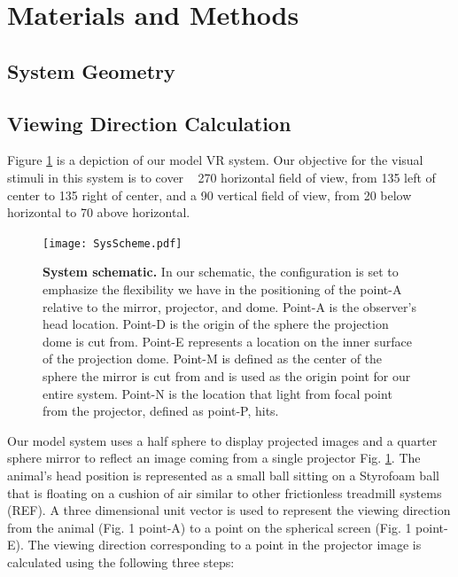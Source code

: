 \documentclass[10pt,letterpaper]{article}
\begin{document}
\section*{Materials and Methods}


\subsection*{System Geometry}

\subsection*{Viewing Direction Calculation}

Figure \ref{fig:SysScheme} is a depiction of our model VR system. Our objective
for the visual stimuli in this system is to cover ~ 270\textdegree{} horizontal
field of view, from 135\textdegree{} left of center to 135\textdegree{} right
of center, and a 90\textdegree{} vertical field of view, from 20\textdegree{}
below horizontal to 70\textdegree{} above horizontal. 

\begin{figure}[h]
\centering
\texttt{[image: SysScheme.pdf]}
\caption{{\bf System schematic.} In our schematic, the configuration is set to
        emphasize the flexibility we have in the positioning of the point-A
        relative to the mirror, projector, and dome. Point-A is the observer's
        head location. Point-D is the origin of the sphere the projection dome
        is cut from. Point-E represents a location on the inner surface of the
        projection dome.  Point-M is defined as the center of the sphere the
        mirror is cut from and is used as the origin point for our entire
        system. Point-N is the location that light from focal point from the
        projector, defined as point-P, hits.}

\label{fig:SysScheme}
\end{figure}
Our model system uses a half sphere to display projected images and a quarter
sphere mirror to reflect an image coming from a single projector Fig.
\ref{fig:SysScheme}. The animal’s head position is represented as a small ball
sitting on a Styrofoam ball that is floating on a cushion of air similar to
other frictionless treadmill systems (REF). A three dimensional unit vector is
used to represent the viewing direction from the animal (Fig. 1 point-A) to a
point on the spherical screen (Fig. 1 point-E). The viewing direction
corresponding to a point in the projector image is calculated using the
following three steps:
\end{document}

